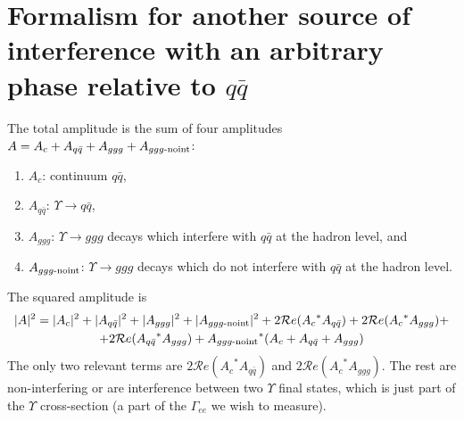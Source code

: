 \documentclass[12pt]{article}
\begin{document}
\section*{Formalism for another source of interference with an arbitrary phase
relative to $q\bar{q}$}

The total amplitude is the sum of four amplitudes $A = A_c + A_{q\bar{q}} + A_{ggg}
+ A_{ggg\mbox{\scriptsize -noint}}$:
\begin{enumerate}
  \item $A_c$: continuum $q\bar{q}$,
  \item $A_{q\bar{q}}$: $\Upsilon \to q\bar{q}$,
  \item $A_{ggg}$: $\Upsilon \to ggg$ decays which interfere with
  $q\bar{q}$ at the hadron level, and
  \item $A_{ggg\mbox{\scriptsize -noint}}$: $\Upsilon \to ggg$ decays
  which do not interfere with $q\bar{q}$ at the hadron level.
\end{enumerate}
The squared amplitude is
\begin{multline}
|A|^2 = |A_c|^2 + |A_{q\bar{q}}|^2 + |A_{ggg}|^2 + |A_{ggg\mbox{\scriptsize -noint}}|^2 +
2 {\mathcal Re}({A_c}^* A_{q\bar{q}}) + 2 {\mathcal Re}({A_c}^* A_{ggg}) + \\ + 2 {\mathcal Re}({A_{q\bar{q}}}^* A_{ggg}) +
{A_{ggg\mbox{\scriptsize -noint}}}^*(A_c + A_{q\bar{q}} + A_{ggg})
\end{multline}
The only two relevant terms are $2 {\mathcal Re}({A_c}^* A_{q\bar{q}})$ and $2
{\mathcal Re}({A_c}^* A_{ggg})$.  The rest are non-interfering or are
interference between two $\Upsilon$ final states, which is just part
of the $\Upsilon$ cross-section (a part of the $\Gamma_{ee}$ we wish
to measure).
\end{document}
